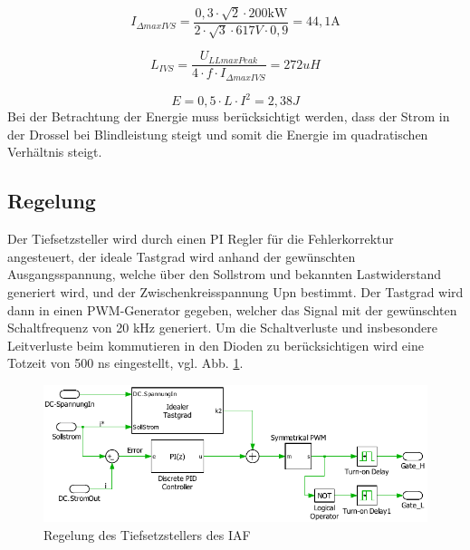 	\begin{equation}
	\label{eq:DeltaIIVS}
	I_{\Delta max IVS}= \dfrac{0,3\cdot \sqrt{2} \cdot 200 \si{\kilo \watt}}{2 \cdot \sqrt{3} \cdot 617 \si{V} \cdot 0,9} = 44,1 \si{\A}
	\end{equation}
	
	\begin{equation}
		\label{eq:ELivs}
		L_{IVS}= \dfrac{U_{LLmaxPeak}}{4\cdot f \cdot I_{\Delta max IVS}} = 272 uH
	\end{equation}
	
	\begin{equation}
		E=0,5 \cdot L \cdot I^{2} = 2,38 J
	\end{equation}
	Bei der Betrachtung der Energie muss berücksichtigt werden, dass der Strom in der Drossel bei Blindleistung steigt und somit die Energie im quadratischen Verhältnis steigt.
	
	\subsection{Regelung}
	Der Tiefsetzsteller wird durch einen PI Regler für die Fehlerkorrektur angesteuert, der ideale Tastgrad wird anhand der gewünschten Ausgangsspannung, welche über den Sollstrom und bekannten Lastwiderstand generiert wird, und der Zwischenkreisspannung \gls{Upn} bestimmt. Der Tastgrad wird dann in einen PWM-Generator gegeben, welcher das Signal mit der gewünschten Schaltfrequenz von 20 kHz generiert. Um die Schaltverluste und insbesondere Leitverluste beim kommutieren in den Dioden zu berücksichtigen wird eine Totzeit von 500 \si{\nano \second} eingestellt, vgl. Abb. \ref{fig:iafbuckcontrol}.
	\begin{figure}[H]
		\centering
		\includegraphics[width=0.9\linewidth]{content/Grafiken/IAF_BuckControl}
		\caption{Regelung des Tiefsetzstellers des IAF}
		\label{fig:iafbuckcontrol}
	\end{figure}
	

